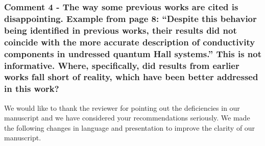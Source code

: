 \documentclass{article}
\begin{document}
\subsubsection*{Comment 4 -
\color{RoyalBlue} The way some previous works are cited is disappointing. Example from page 8: “Despite this behavior being identified in previous works, their results did not coincide with the more accurate description of conductivity components in undressed quantum Hall systems.” This is not informative. Where, specifically, did results from earlier works fall short of reality, which have been better addressed in this work?
}

We would like to thank the reviewer for pointing out the deficiencies in our manuscript and we have considered your recommendations seriously. We made the following changes in language and presentation to improve the clarity of our manuscript.
\end{document}
